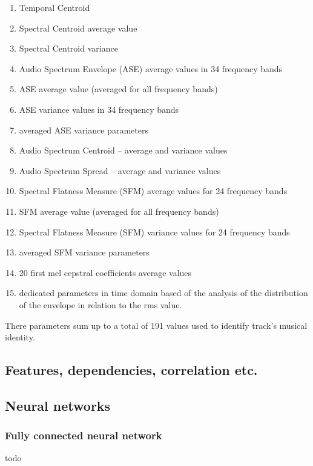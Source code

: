 \documentclass[journal, a4paper]{IEEEtran}
\begin{document}
\begin{enumerate}
\item Temporal Centroid 
\item Spectral Centroid average value 
\item Spectral Centroid variance
\item Audio Spectrum Envelope (ASE) average values in 34 frequency bands
\item ASE average value (averaged for all frequency bands)
\item ASE variance values in 34 frequency bands
\item averaged ASE variance parameters
\item Audio Spectrum Centroid – average and variance values
\item Audio Spectrum Spread – average and variance values
\item Spectral Flatness Measure (SFM) average values for 24 frequency bands
\item SFM average value (averaged for all frequency bands)
\item Spectral Flatness Measure (SFM) variance values for 24 frequency bands
\item averaged SFM variance parameters
\item 20 first mel cepstral coefficients average values 
\item dedicated parameters in time domain based of the analysis of the distribution of the envelope in relation to the rms value.
\end{enumerate}

There parameters sum up to a total of 191 values used to identify track's musical identity. 

\subsection{Features, dependencies, correlation etc.}
\subsection{Neural networks}
\subsubsection{Fully connected neural network}
todo
\end{document}
